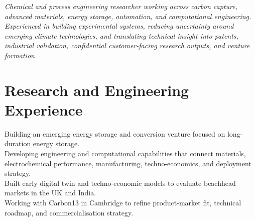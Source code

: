 \documentclass{../../templates/karthicv-single}
\begin{document}
\maketitle

\vspace{-1em}
\begin{center}
\textit{Chemical and process engineering researcher working across carbon capture, advanced materials, energy storage, automation, and computational engineering. Experienced in building experimental systems, reducing uncertainty around emerging climate technologies, and translating technical insight into patents, industrial validation, confidential customer-facing research outputs, and venture formation.}
\end{center}

\section{Research and Engineering Experience}

{Building an emerging energy storage and conversion venture focused on long-duration energy storage.\\
Developing engineering and computational capabilities that connect materials, electrochemical performance, manufacturing, techno-economics, and deployment strategy.\\
Built early digital twin and techno-economic models to evaluate beachhead markets in the UK and India.\\
Working with Carbon13 in Cambridge to refine product-market fit, technical roadmap, and commercialisation strategy.}
\end{document}
